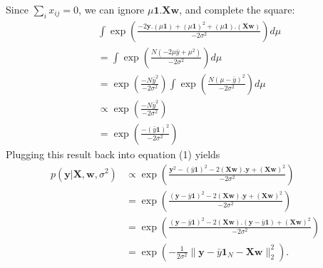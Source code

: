 \documentclass[a4paper,11pt]{article}
\begin{document}
Since $\sum_ix_{ij}=0$, we can ignore
$\mu\mathbf{1}.\mathbf{Xw}$, and
complete the square:
\begin{equation}\begin{split}
&\int\exp\left(\frac{-2\mathbf{y}.(\mu\mathbf{1}) + (\mu\mathbf{1})^2 + (\mu\mathbf{1}).(\mathbf{Xw})}
{-2\sigma^2}\right)d\mu \\
&=\int\exp\left(\frac{N(-2\mu\bar{y} + \mu^2)}{-2\sigma^2}\right)d\mu\\
&= \exp\left(\frac{-N\bar{y}^2  }{-2\sigma^2}\right)
\int\exp\left(\frac{N(\mu - \bar{y})^2}{-2\sigma^2}\right)d\mu\\
&\propto \exp\left(\frac{-N\bar{y}^2  }{-2\sigma^2}\right) \\
&= \exp\left(\frac{-(\bar{y}\mathbf{1})^2}{-2\sigma^2}\right)
\end{split}\end{equation}
Plugging this result back into equation (1) yields
\begin{equation}\begin{split}
p(\mathbf{y}|\mathbf{X}, \mathbf{w}, \sigma^2) &
\propto \exp\left(\frac{\mathbf{y}^2 - (\bar{y}\mathbf{1})^2 -2(\mathbf{Xw}).\mathbf{y} +
(\mathbf{Xw})^2}{-2\sigma^2}\right) \\
&= \exp\left(\frac{(\mathbf{y}-\bar{y}\mathbf{1})^2 -2(\mathbf{Xw}).\mathbf{y} +
(\mathbf{Xw})^2}{-2\sigma^2}\right) \\
&= \exp\left(\frac{(\mathbf{y}-\bar{y}\mathbf{1})^2 -2(\mathbf{Xw}).(\mathbf{y}- \bar{y}\mathbf{1}) +
(\mathbf{Xw})^2}{-2\sigma^2}\right) \\
& = \exp(-\frac{1}{2\sigma^2}\|\mathbf{y} - \bar{y}\mathbf{1}_N - \mathbf{Xw}\|_2^2).
\end{split}\end{equation}
\end{document}

